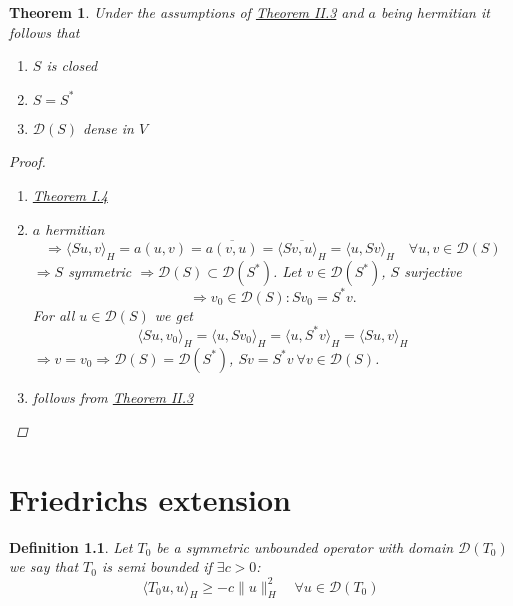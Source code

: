 \documentclass[12pt]{extreport} %
\newcommand{\DO}[1]{\mathcal{D}\left( {#1} \right)}
\theoremstyle{named}
\theoremstyle{nnamed}
\theoremstyle{itshape}
\newtheorem{definition}{Definition}  \counterwithin{definition}{chapter}
\newtheorem{theorem}{Theorem}  \counterwithin{theorem}{chapter}
\theoremstyle{normal}
\begin{document}
\begin{theorem}
	Under the assumptions of \hyperref[thm:2.3]{Theorem II.3} and $a$ being hermitian it follows that
		\begin{enumerate}
			\item $S$ is closed
			\item $S = S^*$
			\item $\DO{S}$ dense in $V$
		\end{enumerate}
		
		\begin{proof} ~\
			\begin{enumerate}
				\item \hyperref[thm:1.4]{Theorem I.4}
				\item $a$ hermitian
					$$ \Rightarrow \langle Su, v \rangle_H = a(u, v) = \overline{a(v, u)} = \overline{\langle Sv, u \rangle_H} = \langle u, Sv \rangle_H \quad \forall u, v \in \DO{S} $$
					$\Rightarrow S$ symmetric $\Rightarrow \DO{S} \subset \DO{S^*}$. Let $v \in \DO{S^*}$, $S$ surjective 
						$$\Rightarrow v_0 \in \DO{S}: S v_0 = S^* v. $$ 
					For all $u \in \DO{S}$ we get
					$$ \langle Su, v_0 \rangle_H = \langle u, S v_0 \rangle_H = \langle u, S^* v \rangle_H = \langle S u, v \rangle_H $$
					$\Rightarrow v = v_0 \Rightarrow \DO{S} = \DO{S^*}$, $Sv = S^* v ~\forall v \in \DO{S}$.
				\item follows from \hyperref[thm:2.3]{Theorem II.3}
			\end{enumerate}	
		\end{proof}
\end{theorem}

\chapter{Friedrichs extension}

\begin{definition}
	Let $T_0$ be a symmetric unbounded operator with domain $\DO{T_0}$ we say that $T_0$ is semi bounded if $\exists c > 0$:
		$$ \langle T_0 u, u \rangle_H \geq - c \| u \|_H^2 \quad \forall u \in \DO{T_0} $$	
\end{definition}
\end{document}
